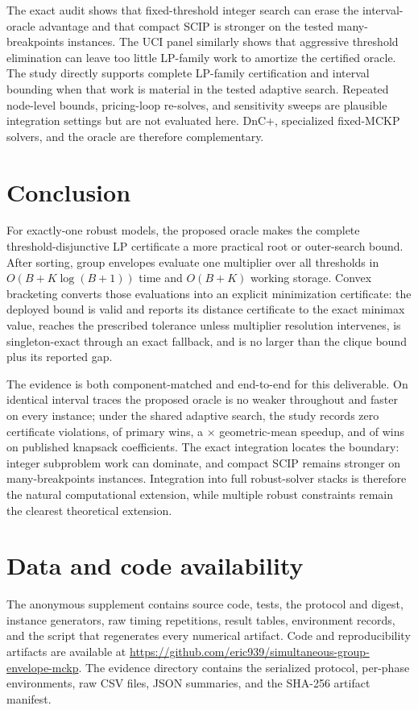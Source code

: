 \documentclass[11pt]{article}
\theoremstyle{plain}
\theoremstyle{definition}
\theoremstyle{remark}
\begin{document}
The exact audit shows that fixed-threshold integer search can erase the interval-oracle advantage and that compact SCIP is stronger on the tested many-breakpoints instances.  The UCI panel similarly shows that aggressive threshold elimination can leave too little LP-family work to amortize the certified oracle.  The study directly supports complete LP-family certification and interval bounding when that work is material in the tested adaptive search.  Repeated node-level bounds, pricing-loop re-solves, and sensitivity sweeps are plausible integration settings but are not evaluated here.  DnC+, specialized fixed-MCKP solvers, and the oracle are therefore complementary.

\section{Conclusion}\label{sec:conclusion}

For exactly-one robust models, the proposed oracle makes the complete threshold-disjunctive LP certificate a more practical root or outer-search bound.  After sorting, group envelopes evaluate one multiplier over all thresholds in $O(B+K\log(B+1))$ time and $O(B+K)$ working storage.  Convex bracketing converts those evaluations into an explicit minimization certificate: the deployed bound is valid and reports its distance certificate to the exact minimax value, reaches the prescribed tolerance unless multiplier resolution intervenes, is singleton-exact through an exact fallback, and is no larger than the clique bound plus its reported gap.

The evidence is both component-matched and end-to-end for this deliverable.  On identical interval traces the proposed oracle is no weaker throughout and faster on every instance; under the shared adaptive search, the study records zero certificate violations, \PubPrimaryWins{} of \PubPrimaryCases{} primary wins, a \PubPrimaryGeoSpeedup$\times$ geometric-mean speedup, and \PubExternalWins{} of \PubExternalCases{} wins on published knapsack coefficients.  The exact integration locates the boundary: integer subproblem work can dominate, and compact SCIP remains stronger on many-breakpoints instances.  Integration into full robust-solver stacks is therefore the natural computational extension, while multiple robust constraints remain the clearest theoretical extension.

\section*{Data and code availability}
\ifblind
The anonymous supplement contains source code, tests, the protocol and digest, instance generators, raw timing repetitions, result tables, environment records, and the script that regenerates every numerical artifact.
\else
Code and reproducibility artifacts are available at
\url{https://github.com/eric939/simultaneous-group-envelope-mckp}.  The evidence directory contains the serialized protocol, per-phase environments, raw CSV files, JSON summaries, and the SHA-256 artifact manifest.
\fi
\end{document}
